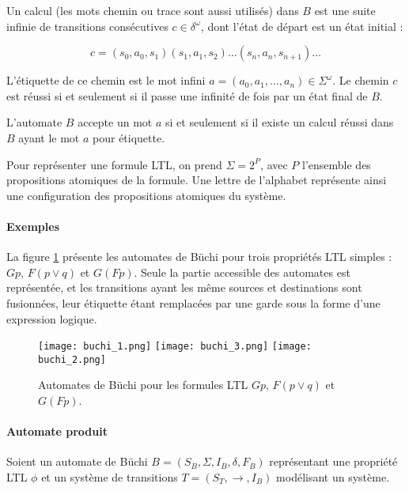 Un calcul (les mots chemin ou trace sont aussi utilisés) dans \(B\) est une
suite infinie de transitions consécutives \(c \in \delta^\omega\), dont l'état
de départ est un état initial :

\[
c = (s_0, a_0, s_1)(s_1, a_1, s_2)\dots(s_n, a_n, s_{n+1})\dots
\]

L'étiquette de ce chemin est le mot infini \(a = (a_0, a_1, \dots, a_n) \in
\Sigma^\omega\). Le chemin \(c\) est réussi si et seulement si il passe une
infinité de fois par un état final de \(B\).

L'automate \(B\) accepte un mot \(a\) si et seulement si
il existe un calcul réussi dans \(B\) ayant le mot \(a\) pour étiquette.

Pour représenter une formule LTL, on prend \(\Sigma = 2^P\), avec \(P\)
l'ensemble des propositions atomiques de la formule. Une lettre de
l'alphabet représente ainsi une configuration des propositions atomiques
du système.

\paragraph{Exemples}

La figure \ref{fig:buchi_example} présente les automates de Büchi pour trois propriétés
LTL simples : \(Gp\), \(F(p \lor q)\) et \(G(Fp)\). Seule la partie accessible des automates
est représentée, et les transitions ayant les même sources et destinations sont fusionnées,
leur étiquette étant remplacées par une garde sous la forme d'une expression logique.

\begin{figure}
\begin{center}
\texttt{[image: buchi\_1.png]}
\texttt{[image: buchi\_3.png]}
\texttt{[image: buchi\_2.png]}
\end{center}
\caption{Automates de Büchi pour les formules LTL $G p$, $F(p \lor q)$ et
$G(F p)$.}
\label{fig:buchi_example}
\end{figure}

\paragraph{Automate produit}

Soient un automate de Büchi \(B = (S_B, \Sigma, I_B, \delta, F_B)\) représentant
une propriété LTL \(\phi\) et un système de transitions \(T = (S_T, \rightarrow,
I_B)\) modélisant un système.

